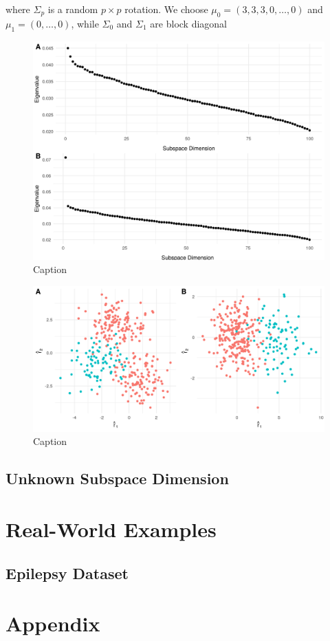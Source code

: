 \documentclass[12pt]{article}
\begin{document}
where $\Sigma_p$ is a random $p\times p$ rotation. We choose $\mu_0 = (3, 3, 3, 0, \ldots, 0)$ and $\mu_1 = (0, \ldots, 0)$, while $\Sigma_0$ and $\Sigma_1$ are block diagonal


\begin{figure}
    \centering
    \includegraphics[width=6in]{../results/figures/sim_evs.png}
    \caption{Caption}
    \label{fig:sim_evs}
\end{figure}

\begin{figure}
    \centering
    \includegraphics[width=6in]{../results/figures/sim_rvs.png}
    \caption{Caption}
    \label{fig:sim_rvs}
\end{figure}

\subsection{Unknown Subspace Dimension}


\section{Real-World Examples}


\subsection{Epilepsy Dataset}


\section*{Appendix}




\end{document}

